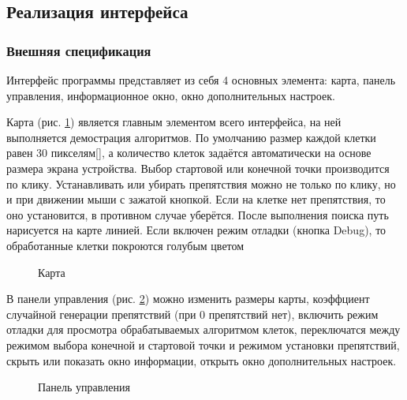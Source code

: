 \subsection{Реализация интерфейса}
\subsubsection{Внешняя спецификация}
Интерфейс программы представляет из себя 4 основных элемента: карта, панель управления, информационное окно, окно дополнительных настроек.

Карта (рис. \ref{map}) является главным элементом всего интерфейса, на ней выполняется демострация алгоритмов. По умолчанию размер каждой клетки равен 30 пикселям[], а количество клеток задаётся автоматически на основе размера экрана устройства. Выбор стартовой или конечной точки производится по клику.
Устанавливать или убирать препятствия можно не только по клику, но и при движении мыши с зажатой кнопкой. Если на клетке нет препятствия, то оно установится, в противном случае уберётся. После выполнения поиска путь нарисуется на карте линией. Если включен режим отладки (кнопка Debug), то обработанные клетки покроются голубым цветом

\begin{figure}[h]
\caption{Карта}
\label{map}
\end{figure}

В панели управления (рис. \ref{ctrlPanel}) можно изменить размеры карты, коэффциент случайной генерации препятствий (при 0 препятствий нет), включить режим отладки для просмотра обрабатываемых алгоритмом клеток, переключатся между режимом выбора конечной и стартовой точки и режимом установки препятствий, скрыть или показать окно информации, открыть окно дополнительных настроек.

\begin{figure}[h]
\caption{Панель управления}
\label{ctrlPanel}
\end{figure}

